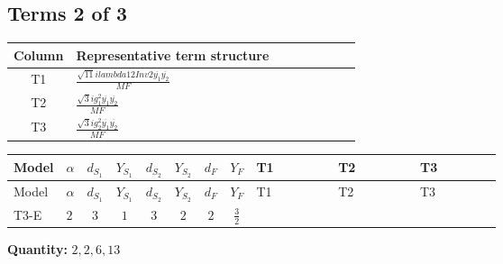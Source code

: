 \documentclass[8pt]{article}
\begin{document}
\begin{landscape}
\subsection*{Terms 2 of 3}
\begin{center}
\begin{tabular}{@{}c >{\raggedright\arraybackslash}p{0.82\linewidth}@{}}
\toprule
Column & Representative term structure \\
\midrule
T1 & \(\displaystyle \frac{\sqrt{11} i lambda12Inv2 \overline{y_{1}} \overline{y_{2}}}{MF}\) \\
\midrule
T2 & \(\displaystyle \frac{\sqrt{3} i g_{1}^{2} \overline{y_{1}} \overline{y_{2}}}{MF}\) \\
\midrule
T3 & \(\displaystyle \frac{\sqrt{3} i g_{2}^{2} \overline{y_{1}} \overline{y_{2}}}{MF}\) \\
\midrule
\bottomrule
\end{tabular}
\end{center}
\smallskip
\tiny
\begin{longtable}{@{}llcccccc >{\raggedright\arraybackslash}p{0.21\linewidth} >{\raggedright\arraybackslash}p{0.21\linewidth} >{\raggedright\arraybackslash}p{0.21\linewidth}@{}}
\toprule
Model & $\alpha$ & $d_{S_1}$ & $Y_{S_1}$ & $d_{S_2}$ & $Y_{S_2}$ & $d_F$ & $Y_F$ & T1 & T2 & T3 \\
\midrule
\endfirsthead
\toprule
Model & $\alpha$ & $d_{S_1}$ & $Y_{S_1}$ & $d_{S_2}$ & $Y_{S_2}$ & $d_F$ & $Y_F$ & T1 & T2 & T3 \\
\midrule
\endhead
T3-E & $2$ & $3$ & $1$ & $3$ & $2$ & $2$ & $\frac{3}{2}$ & \scriptsize\adjustbox{max width=\linewidth}{$\begin{gathered} \frac{3 \sqrt{11} i lambda12Inv2 \overline{y_{1}} \overline{y_{2}}}{22 MF}\end{gathered}$} & \scriptsize\adjustbox{max width=\linewidth}{$\begin{gathered} \frac{9 \sqrt{3} i g_{1}^{2} \overline{y_{1}} \overline{y_{2}}}{8 MF}\end{gathered}$} & \scriptsize\adjustbox{max width=\linewidth}{$\begin{gathered} \frac{49 \sqrt{3} i g_{2}^{2} \overline{y_{1}} \overline{y_{2}}}{24 MF}\end{gathered}$} \\
\midrule
\bottomrule
\end{longtable}
\clearpage
\noindent\textbf{Quantity: }$\mathrm{2,2,6,13}$\par\smallskip

\end{landscape}
\end{document}
